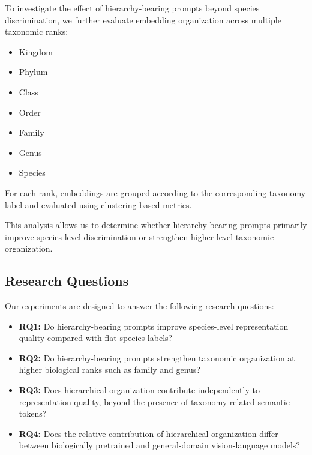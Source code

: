 To investigate the effect of hierarchy-bearing prompts beyond species discrimination, we further evaluate embedding organization across multiple taxonomic ranks:

\begin{itemize}
    \item Kingdom
    \item Phylum
    \item Class
    \item Order
    \item Family
    \item Genus
    \item Species
\end{itemize}

For each rank, embeddings are grouped according to the corresponding taxonomy label and evaluated using clustering-based metrics.

This analysis allows us to determine whether hierarchy-bearing prompts primarily improve species-level discrimination or strengthen higher-level taxonomic organization.

\subsection{Research Questions}

Our experiments are designed to answer the following research questions:

\begin{itemize}
    \item \textbf{RQ1:} Do hierarchy-bearing prompts improve species-level representation quality compared with flat species labels?

    \item \textbf{RQ2:} Do hierarchy-bearing prompts strengthen taxonomic organization at higher biological ranks such as family and genus?

    \item \textbf{RQ3:} Does hierarchical organization contribute independently to representation quality, beyond the presence of taxonomy-related semantic tokens?

    \item \textbf{RQ4:} Does the relative contribution of hierarchical organization differ between biologically pretrained and general-domain vision-language models?
\end{itemize}

